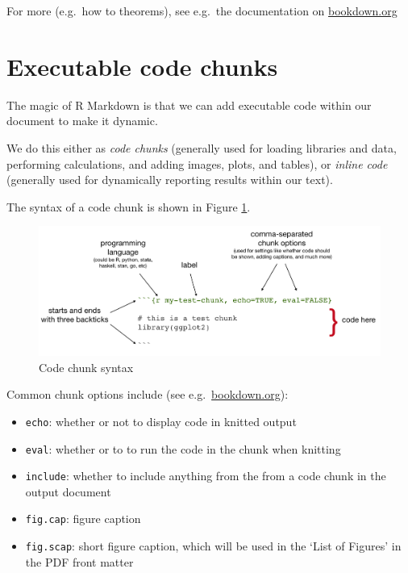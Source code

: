 \documentclass[a4paper, twoside]{templates/ociamthesis}
\providecommand{\tightlist}{%
  \setlength{\itemsep}{0pt}\setlength{\parskip}{0pt}}
\theoremstyle{definition}
\theoremstyle{definition}
\theoremstyle{definition}
\theoremstyle{definition}
\theoremstyle{remark}
\begin{document}
For more (e.g.~how to theorems), see e.g.~the documentation on \href{https://bookdown.org/yihui/bookdown/markdown-extensions-by-bookdown.html\#equations}{bookdown.org}

\hypertarget{code}{%
\section{Executable code chunks}\label{code}}

The magic of R Markdown is that we can add executable code within our document to make it dynamic.

We do this either as \emph{code chunks} (generally used for loading libraries and data, performing calculations, and adding images, plots, and tables), or \emph{inline code} (generally used for dynamically reporting results within our text).

The syntax of a code chunk is shown in Figure \ref{fig:chunk-parts}.

\begin{figure}[H]
\includegraphics[width=1\linewidth]{figures/sample-content/chunk-parts} \caption{Code chunk syntax}\label{fig:chunk-parts}
\end{figure}

Common chunk options include (see e.g.~\href{https://bookdown.org/yihui/rmarkdown/r-code.html}{bookdown.org}):

\begin{itemize}
\tightlist
\item
  \texttt{echo}: whether or not to display code in knitted output
\item
  \texttt{eval}: whether or to to run the code in the chunk when knitting
\item
  \texttt{include}: whether to include anything from the from a code chunk in the output document
\item
  \texttt{fig.cap}: figure caption
\item
  \texttt{fig.scap}: short figure caption, which will be used in the `List of Figures' in the PDF front matter
\end{itemize}
\end{document}
